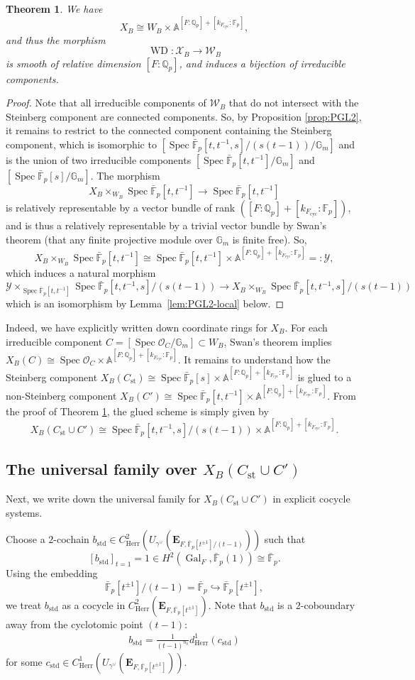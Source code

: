 \documentclass[11pt]{amsart}
\newtheorem{thm}{Theorem}[section]
\theoremstyle{definition}
\newcommand{\Q}{\mathbb{Q}}
\newcommand{\G}{\mathbb{G}}
\newcommand{\F}{\mathbb{F}}
\newcommand{\A}{\mathbb{A}}
\newcommand{\bfE}{\mathbf{E}}
\newcommand{\bFp}{\bar{\mathbb{F}}_p}
\newcommand{\cO}{\mathcal{O}}
\newcommand{\cX}{\mathcal{X}}
\newcommand{\cY}{\mathcal{Y}}
\newcommand{\cW}{\mathcal{W}}
\newcommand{\cyc}{{\operatorname{cyc}}}
\newcommand{\dkF}{[k_{F_{\cyc}}:\F_p]}
\newcommand{\dF}{[F:\Q_p]}
\DeclareMathOperator{\std}{std}
\DeclareMathOperator{\WD}{WD}
\DeclareMathOperator{\Spec}{Spec}
\DeclareMathOperator{\Gal}{Gal}
\DeclareMathOperator{\st}{st}
\newcommand{\Herr}{\mathrm{Herr}}
\begin{document}
\begin{thm}
\rm
We have
\[
X_B\cong W_B\times \A^{\dF+\dkF},
\]
and thus
the morphism
\[
\WD:\cX_{B}\to \cW_{B}
\]
is smooth of relative dimension $\dF$,
and induces a bijection of irreducible components.
\label{thm:PGL2-eqn}
\end{thm}

\begin{proof}
Note that all irreducible components of $\cW_{B}$
that do not intersect with the Steinberg component
are connected components.
So, by Proposition \ref{prop:PGL2}, it remains to
restrict to the connected component containing the Steinberg
component, which is isomorphic to
$[\Spec \bFp[t, t^{-1}, s]/(s(t-1))/\G_m]$
and is the union of two irreducible components
$[\Spec \bFp[t,t^{-1}]/\G_m]$
and
$[\Spec \bFp[s]/\G_m]$.
The morphism
\[
X_{B}\times_{W_B}\Spec \bFp[t,t^{-1}]
\to \Spec \bFp[t,t^{-1}]
\]
is relatively representable by a vector bundle of
rank $(\dF+\dkF)$,
and is thus a relatively representable by
a trivial vector bundle by Swan's theorem
(that any finite projective module over $\G_m$ is finite free).
So, \[
X_{B}\times_{W_B}\Spec \bFp[t,t^{-1}]
\cong \Spec \bFp[t,t^{-1}]\times \A^{\dF+\dkF}
=:\cY,
\]
which induces a natural morphism
\[
\cY\times_{\Spec \bFp[t,t^{-1}]}
\Spec \bFp[t, t^{-1}, s]/(s(t-1))
\to 
X_{B}\times_{W_B}\Spec \bFp[t, t^{-1}, s]/(s(t-1))
\]
which is an isomorphism by Lemma~\ref{lem:PGL2-local} below.
\end{proof}

Indeed, we have explicitly written down
coordinate rings for $X_B$.
For each irreducible component
$C=[\Spec \cO_C/\G_m]\subset W_B$,
Swan's theorem implies
$X_B(C)\cong \Spec \cO_C \times \A^{\dF+\dkF}$.
It remains to understand how the Steinberg
component $X_B(C_{\st})
\cong \Spec \bFp[s]\times \A^{\dF+\dkF}$
is glued to a non-Steinberg component
$X_B(C')
\cong \Spec \bFp[t,t^{-1}]\times \A^{\dF+\dkF}$.
From the proof of Theorem \ref{thm:PGL2-eqn},
the glued scheme is simply given by
\[
X_B(C_{\st}\cup C')\cong
\Spec \bFp[t,t^{-1},s]/(s(t-1))\times \A^{\dF+\dkF}.
\]

\subsection{The universal family
over $X_B(C_{\st}\cup C')$}
Next, we write down
the universal family
for $X_B(C_{\st}\cup C')$
in explicit cocycle systems.

 
Choose a $2$-cochain
$b_{\std}\in C^2_{\Herr}(U_{\gamma^\vee}(\bfE_{F,
\bFp[t^{\pm1}]/(t-1)
}))$
such that
\[
[b_{\std}]_{t=1}=1\in H^2(\Gal_F, \bFp(1))\cong \bFp.
\]
Using the embedding
\[
\bFp[t^{\pm1}]/(t-1)
=\bFp
\hookrightarrow
\bFp[t^{\pm1}],
\]
we treat $b_{\std}$ as a cocycle
in 
$C^2_{\Herr}(\bfE_{F,
\bFp[t^{\pm1}]})$.
Note that $b_{\std}$
is a $2$-coboundary away from
the cyclotomic point
$(t-1)$:
\begin{align}
\label{eq:cstd}
b_{\std}=\frac{1}{(t-1)^{n_0}}d^1_{\Herr}(c_{\std})
\end{align}
for some $c_{\std}\in C^1_{\Herr}(U_{\gamma^\vee}(\bfE_{F,
\bFp[t^{\pm1}]}))$.
\end{document}
